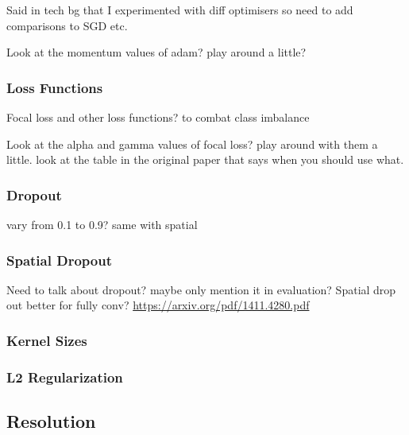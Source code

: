 Said in tech bg that I experimented with diff optimisers so need to add comparisons to SGD etc.

Look at the momentum values of adam? play around a little?

\subsubsection{Loss Functions}

Focal loss and other loss functions? to combat class imbalance

Look at the alpha and gamma values of focal loss? play around with them a little. look at the table in the original paper that says when you should use what.

\subsubsection{Dropout}

vary from 0.1 to 0.9? same with spatial

\subsubsection{Spatial Dropout}

Need to talk about dropout? maybe only mention it in evaluation?
Spatial drop out better for fully conv? \url{https://arxiv.org/pdf/1411.4280.pdf}


\subsubsection{Kernel Sizes}

\subsubsection{L2 Regularization}

\subsection{Resolution}

